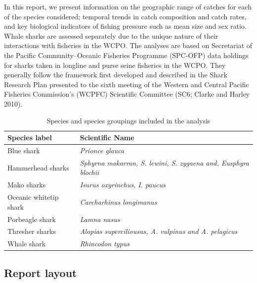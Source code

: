 \documentclass[12pt]{SCreport}
\begin{document}
In this report, we present information on the geographic range of catches for each of the species considered; temporal trends in catch composition and catch rates, and key biological indicators of fishing pressure such as mean size and sex ratio. Whale sharks are assessed separately due to the unique nature of their interactions with fisheries in the WCPO. The analyses are based on Secretariat of the Pacific Community--Oceanic Fisheries Programme (SPC-OFP) data holdings for sharks taken in longline and purse seine fisheries in the WCPO.  They generally follow the framework first developed and described in the Shark Research Plan presented to the sixth meeting of the Western and Central Pacific Fisheries Commission's (WCPFC) Scientific Committee (SC6; Clarke and Harley 2010). 

\begin{table}[!h]
\label{tbl:sppgroups}
\begin{center}
\caption{Species and species groupings included in the analysis}
\begin{tabular}{l|l}
Species label & Scientific Name\\
\hline
\hline
Blue shark        &	\textit{Prionce glauca}\\
Hammerhead sharks & \textit{Sphyrna mokarran, S. lewini, S. zygaena and, Eusphyra blochii}\\
Mako sharks       & \textit{Isurus oxyrinchus, I. paucus}\\
Oceanic whitetip shark & \textit{Carcharhinus longimanus}\\
Porbeagle shark	  & \textit{Lamna nasus}\\
Thresher sharks	  & \textit{Alopias superciliousus, A. vulpinus and A. pelagicus}\\
Whale shark	      & \textit{Rhincodon typus} \\
\hline
\end{tabular} 
\end{center}
\end{table}




\subsection{Report layout}
\end{document}
